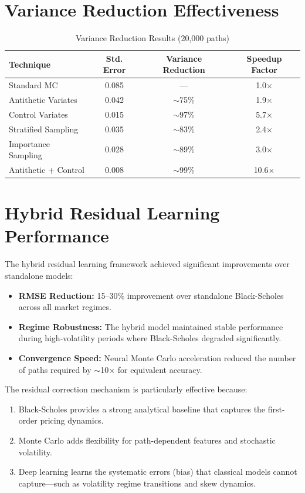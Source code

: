 \documentclass[12pt,a4paper]{report}
\begin{document}
\section{Variance Reduction Effectiveness}

\begin{table}[H]
\centering
\caption{Variance Reduction Results (20,000 paths)}
\label{tab:variance-reduction}
\begin{tabularx}{\textwidth}{|l|c|c|c|}
\hline
\textbf{Technique} & \textbf{Std. Error} & \textbf{Variance Reduction} & \textbf{Speedup Factor} \\
\hline
Standard MC & 0.085 & --- & 1.0$\times$ \\
\hline
Antithetic Variates & 0.042 & $\sim$75\% & 1.9$\times$ \\
\hline
Control Variates & 0.015 & $\sim$97\% & 5.7$\times$ \\
\hline
Stratified Sampling & 0.035 & $\sim$83\% & 2.4$\times$ \\
\hline
Importance Sampling & 0.028 & $\sim$89\% & 3.0$\times$ \\
\hline
Antithetic + Control & 0.008 & $\sim$99\% & 10.6$\times$ \\
\hline
\end{tabularx}
\end{table}

\section{Hybrid Residual Learning Performance}

The hybrid residual learning framework achieved significant improvements over standalone models:

\begin{itemize}
    \item \textbf{RMSE Reduction:} 15--30\% improvement over standalone Black-Scholes across all market regimes.
    \item \textbf{Regime Robustness:} The hybrid model maintained stable performance during high-volatility periods where Black-Scholes degraded significantly.
    \item \textbf{Convergence Speed:} Neural Monte Carlo acceleration reduced the number of paths required by $\sim$10$\times$ for equivalent accuracy.
\end{itemize}

The residual correction mechanism is particularly effective because:
\begin{enumerate}
    \item Black-Scholes provides a strong analytical baseline that captures the first-order pricing dynamics.
    \item Monte Carlo adds flexibility for path-dependent features and stochastic volatility.
    \item Deep learning learns the systematic errors (bias) that classical models cannot capture---such as volatility regime transitions and skew dynamics.
\end{enumerate}
\end{document}
